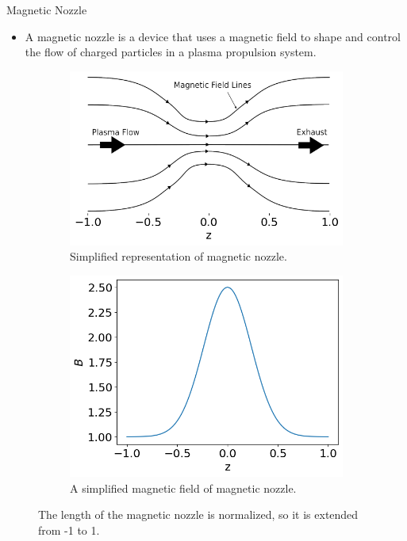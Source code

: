 \begin{frame}{Magnetic Nozzle}
  \begin{itemize}
    \item A magnetic nozzle is a device that uses a magnetic field to shape and control the flow of charged particles in a plasma propulsion system.
  \end{itemize}
\begin{figure}[htbp]
  \centering
  \begin{subfigure}{0.45\textwidth}
    \centering
    \includegraphics[width=\linewidth]{../../thesis/img/introduction/magnetic-nozzle}
    \caption{Simplified representation of magnetic nozzle.} 
  \end{subfigure}%
  \begin{subfigure}{0.45\textwidth}
    \centering
    \includegraphics[width=\linewidth]{../../thesis/img/introduction/magnetic-field.png}
    \caption{A simplified magnetic field of magnetic nozzle.} 
  \end{subfigure}
  \caption{The length of the magnetic nozzle is normalized, so it is extended from -1 to 1.}
	\label{fig:magnetic-nozzle}
\end{figure}
\end{frame}

